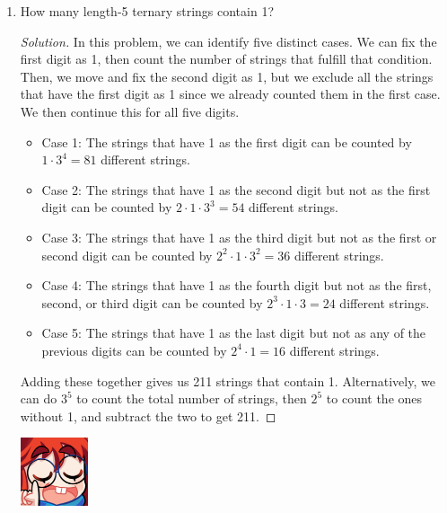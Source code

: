 \documentclass{article}
\newenvironment{solution}
  {\renewcommand\qedsymbol{$\blacksquare$}\begin{proof}[Solution]}
  {\end{proof}}
\begin{document}
\begin{enumerate}
\begin{solution}
\begin{itemize}
            \item Case 2: The strings that end with 1 and do not start with 1 can be counted by fixing the last digit, then allowing only two options for the first digit, then multiplying the possibilities for the rest. 
            Thus, $2 \cdot 3^5 \cdot 1 = 486$ strings. 
        \end{itemize} Adding these together gives us 1215 strings of length 7 that either start with 1 or end with 1. 
    \end{solution} 
    \item How many length-5 ternary strings contain 1?\begin{solution} 
        In this problem, we can identify five distinct cases. We can fix the first digit as 1, then count the number of strings that fulfill that condition. Then, we move and 
        fix the second digit as 1, but we exclude all the strings that have the first digit as 1 since we already counted them in the first case. We then continue this for all five digits. 
        \begin{itemize} 
            \item Case 1: The strings that have 1 as the first digit can be counted by $ 1 \cdot 3^4 = 81$ different strings. 
            \item Case 2: The strings that have 1 as the second digit but not as the first digit can be counted by $2 \cdot 1 \cdot 3^3 = 54$ different strings. 
            \item Case 3: The strings that have 1 as the third digit but not as the first or second digit can be counted by $ 2^2 \cdot 1 \cdot 3^2 = 36$ different strings. 
            \item Case 4: The strings that have 1 as the fourth digit but not as the first, second, or third digit can be counted by $ 2^3 \cdot 1 \cdot 3 = 24$ different strings.
            \item Case 5: The strings that have 1 as the last digit but not as any of the previous digits can be counted by $ 2^4 \cdot 1 = 16$ different strings.
        \end{itemize} Adding these together gives us 211 strings that contain 1. Alternatively, we can do $3^5$ to count the total number of strings, then $2^5$ to count the ones without 1, and subtract the two to get 211.  
    \end{solution}%
    \begin{minipage}[t]{.14\textwidth}
        \vspace{0pt}
        \includegraphics[width=2cm]{nerd_maddy.png} 

\end{minipage}
\end{enumerate}
\end{document}
